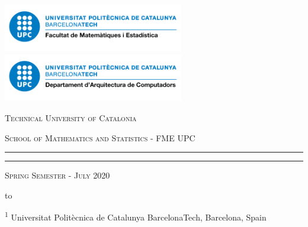 \thispagestyle{empty}
\begin{center}

    \includegraphics[height=2.1cm]{img/logo_fme.png} 
    \hfill
    \includegraphics[height=2.1cm]{img/logo_ac.png}

    \vspace{0.5cm}

    \Large
    \textsc{Technical University of Catalonia} 

    \textsc{School of Mathematics and Statistics - FME UPC}

    \LARGE
    \rule{\textwidth}{0.4pt}
    \textbf{\titleEN}
    \rule[0.5cm]{\textwidth}{0.4pt}

    \vspace{-0.2cm}
    \Large
    \textsc{Spring Semester - July 2020}
    \vspace{0.7cm}

    \normalsize
    \leavevmode\hbox to 

    \vspace{1cm}
    \footnotesize
    \textsuperscript{1} Universitat Polit\`ecnica de Catalunya BarcelonaTech, Barcelona, Spain


\end{center}
